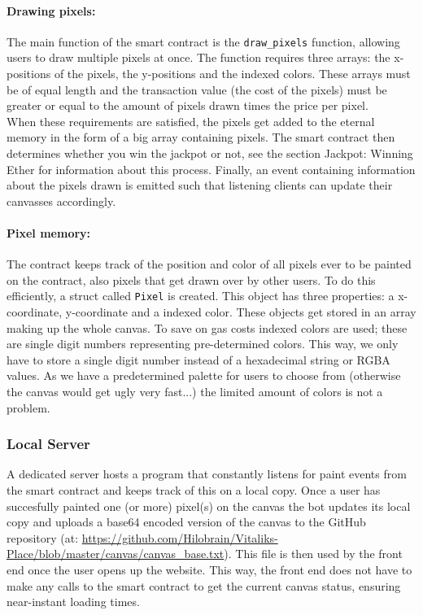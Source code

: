 \documentclass[a4paper]{article}
\begin{document}
\paragraph{Drawing pixels:}
The main function of the smart contract is the \lstinline{draw_pixels} function, allowing users to draw multiple pixels at once. The function requires three arrays: the x-positions of the pixels, the y-positions and the indexed colors. These arrays must be of equal length and the transaction value (the cost of the pixels) must be greater or equal to the amount of pixels drawn times the price per pixel. \\
When these requirements are satisfied, the pixels get added to the eternal memory in the form of a big array containing pixels. The smart contract then determines whether you win the jackpot or not, see the section Jackpot: Winning Ether for information about this process. Finally, an event containing information about the pixels drawn is emitted such that listening clients can update their canvasses accordingly.
\paragraph{Pixel memory:} The contract keeps track of the position and color of all pixels ever to be painted on the contract, also pixels that get drawn over by other users. To do this efficiently, a struct called \lstinline{Pixel} is created. This object has three properties: a x-coordinate, y-coordinate and a indexed color. These objects get stored in an array making up the whole canvas. To save on gas costs indexed colors are used; these are single digit numbers representing pre-determined colors. This way, we only have to store a single digit number instead of a hexadecimal string or RGBA values. As we have a predetermined palette for users to choose from (otherwise the canvas would get ugly very fast...) the limited amount of colors is not a problem.

\subsubsection{Local Server}
A dedicated server hosts a program that constantly listens for paint events from the smart contract and keeps track of this on a local copy. Once a user has succesfully painted one (or more) pixel(s) on the canvas the bot updates its local copy and uploads a base64 encoded version of the canvas to the GitHub repository (at: \url{https://github.com/Hilobrain/Vitaliks-Place/blob/master/canvas/canvas_base.txt}). This file is then used by the front end once the user opens up the website. This way, the front end does not have to make any calls to the smart contract to get the current canvas status, ensuring near-instant loading times.
\end{document}
